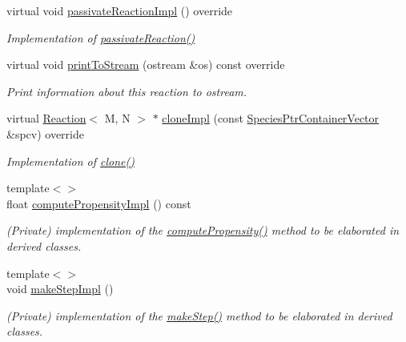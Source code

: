 \begin{DoxyCompactItemize}
virtual void \hyperlink{classReaction_af4d0dfeacaf4bf2a91aea23c88225485}{passivate\+Reaction\+Impl} () override
\begin{DoxyCompactList}\small\item\em Implementation of \hyperlink{classReactionBase_a90e7fe3533314f36ae386c308235c372}{passivate\+Reaction()} \end{DoxyCompactList}\item 
virtual void \hyperlink{classReaction_a14c0b262ed191ea326712ff3a7ec037d}{print\+To\+Stream} (ostream \&os) const override
\begin{DoxyCompactList}\small\item\em Print information about this reaction to ostream. \end{DoxyCompactList}\item 
virtual \hyperlink{classReaction}{Reaction}$<$ M, N $>$ $\ast$ \hyperlink{classReaction_aacb43ca62f749d2666011e7f1869cb93}{clone\+Impl} (const \hyperlink{classSpeciesPtrContainerVector}{Species\+Ptr\+Container\+Vector} \&spcv) override
\begin{DoxyCompactList}\small\item\em Implementation of \hyperlink{classReactionBase_adb75e6b8d5baf4c5d3f80f3c22a1c919}{clone()} \end{DoxyCompactList}\item 
{\footnotesize template$<$$>$ }\\float \hyperlink{classReaction_a7ed87a3e8211e4e20f7403e668670fe4}{compute\+Propensity\+Impl} () const
\begin{DoxyCompactList}\small\item\em (Private) implementation of the \hyperlink{classReactionBase_a45c31c853c6db84ab472816a64528f98}{compute\+Propensity()} method to be elaborated in derived classes. \end{DoxyCompactList}\item 
{\footnotesize template$<$$>$ }\\void \hyperlink{classReaction_a9f6f59f6d8f6e9697f433ab6c310320f}{make\+Step\+Impl} ()
\begin{DoxyCompactList}\small\item\em (Private) implementation of the \hyperlink{classReactionBase_a565e2d5fac7efaf63f19dab909428882}{make\+Step()} method to be elaborated in derived classes. \end{DoxyCompactList}\end{DoxyCompactItemize}
